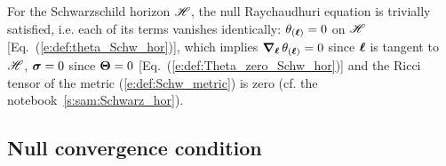 \begin{example} \label{x:def:Schw_hor9}
For the Schwarzschild horizon $\mathscr{H}$, the null Raychaudhuri equation is
trivially satisfied, i.e. each of its terms vanishes identically:
$\theta_{(\bm{\ell})}=0$ on $\mathscr{H}$ [Eq.~(\ref{e:def:theta_Schw_hor})],
which implies $\bm{\nabla}_{\bm{\ell}}\,  \theta_{(\bm{\ell})}=0$ since $\bm{\ell}$ is tangent to $\mathscr{H}$,
$\bm{\sigma}=0$ since $\bm{\Theta}=0$ [Eq.~(\ref{e:def:Theta_zero_Schw_hor})]
and the Ricci tensor of the metric (\ref{e:def:Schw_metric}) is zero
(cf. the notebook~\ref{s:sam:Schwarz_hor}).
\end{example}


\subsection{Null convergence condition} \label{s:def:null_convergence_cond}


